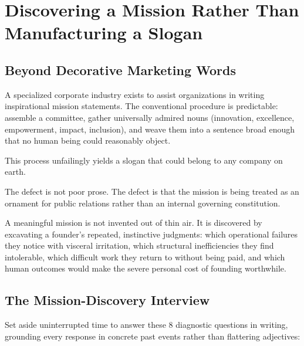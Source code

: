 \section{Discovering a Mission Rather Than Manufacturing a Slogan}

\subsection{Beyond Decorative Marketing Words}

A specialized corporate industry exists to assist organizations in writing inspirational mission statements. The conventional procedure is predictable: assemble a committee, gather universally admired nouns (innovation, excellence, empowerment, impact, inclusion), and weave them into a sentence broad enough that no human being could reasonably object.

This process unfailingly yields a slogan that could belong to any company on earth.

The defect is not poor prose. The defect is that the mission is being treated as an ornament for public relations rather than an internal governing constitution.

A meaningful mission is not invented out of thin air. It is discovered by excavating a founder's repeated, instinctive judgments: which operational failures they notice with visceral irritation, which structural inefficiencies they find intolerable, which difficult work they return to without being paid, and which human outcomes would make the severe personal cost of founding worthwhile.

\subsection{The Mission-Discovery Interview}

Set aside uninterrupted time to answer these 8 diagnostic questions in writing, grounding every response in concrete past events rather than flattering adjectives:

